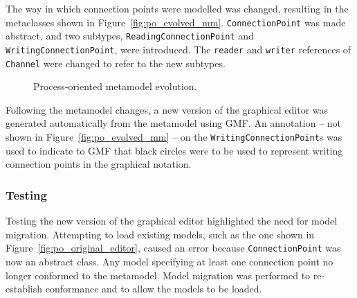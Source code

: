 The way in which connection points were modelled was changed, resulting in the metaclasses shown in Figure~\ref{fig:po_evolved_mm}. \texttt{Co\-nn\-ec\-ti\-o\-nPo\-i\-nt} was made abstract, and two subtypes, \texttt{Re\-ad\-i\-ngCo\-nn\-ec\-ti\-o\-nPo\-i\-nt} and \texttt{Wr\-i\-ti\-ngCo\-nn\-ec\-ti\-o\-nPo\-i\-nt}, were introduced. The \texttt{re\-ad\-er} and \texttt{wr\-it\-er} references of \texttt{Ch\-an\-n\-el} were changed to refer to the new subtypes.

\begin{figure}[htbp]
	\centering
	\caption{Process-oriented metamodel evolution.}
\label{fig:po_mms}
\end{figure}

Following the metamodel changes, a new version of the graphical editor was generated automatically from the metamodel using GMF. An annotation -- not shown in Figure~\ref{fig:po_evolved_mm} -- on the \texttt{Wr\-i\-ti\-ngCo\-nn\-ec\-ti\-o\-nPo\-i\-nt}s was used to indicate to GMF that black circles were to be used to represent writing connection points in the graphical notation.

\subsubsection{Testing}
Testing the new version of the graphical editor highlighted the need for model migration. Attempting to load existing models, such as the one shown in Figure~\ref{fig:po_original_editor}, caused an error because \texttt{Co\-nn\-ec\-ti\-onP\-oi\-nt} was now an abstract class. Any model specifying at least one connection point no longer conformed to the metamodel. Model migration was performed to re-establish conformance and to allow the models to be loaded. 

